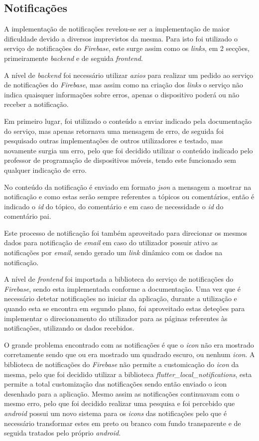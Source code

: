 \subsection{Notificações}

A implementação de notificações revelou-se ser a implementação de maior dificuldade devido a diversos imprevistos da mesma. Para isto foi utilizado o serviço de notificações do \textit{Firebase}, este surge assim como os \textit{links}, em 2 secções, primeiramente \textit{backend} e de seguida \textit{frontend}.

A nível de \textit{backend} foi necessário utilizar \textit{axios} para realizar um pedido ao serviço de notificações do \textit{Firebase}, mas assim como na criação dos \textit{links} o serviço não indica quaisquer informações sobre erros, apenas o dispositivo poderá ou não receber a notificação. 

Em primeiro lugar, foi utilizado o conteúdo a enviar indicado pela documentação do serviço, mas apenas retornava uma mensagem de erro, de seguida foi pesquisado outras implementações de outros utilizadores e testado, mas novamente surgia um erro, pelo que foi decidido utilizar o conteúdo indicado pelo professor de programação de dispositivos móveis, tendo este funcionado sem qualquer indicação de erro. 

No conteúdo da notificação é enviado em formato \textit{json} a mensagem a mostrar na notificação e como estas serão sempre referentes a tópicos ou comentários, então é indicado o \textit{id} do tópico, do comentário e em caso de necessidade o \textit{id} do comentário pai.

Este processo de notificação foi também aproveitado para direcionar os mesmos dados para notificação de \textit{email} em caso do utilizador possuir ativo as notificações por \textit{email}, sendo gerado um \textit{link} dinâmico com os dados na notificação.

A nível de \textit{frontend} foi importada a biblioteca do serviço de notificações do \textit{Firebase}, sendo esta implementada conforme a documentação. Uma vez que é necessário detetar notificações no iniciar da aplicação, durante a utilização e quando esta se encontra em segundo plano, foi aproveitado estas deteções para implementar o direcionamento do utilizador para as páginas referentes às notificações, utilizando os dados recebidos.

O grande problema encontrado com as notificações é que o \textit{icon} não era mostrado corretamente sendo que ou era mostrado um quadrado escuro, ou nenhum \textit{icon}. A biblioteca de notificações do \textit{Firebase} não permite a customicação do \textit{icon} da mesma, pelo que foi decidido utilizar a biblioteca \textit{flutter\_local\_notifications}, esta permite a total customização das notificações sendo então enviado o icon desenhado para a aplicação. Mesmo assim as notificações continuavam com o mesmo erro, pelo que foi decidido realizar uma pesquisa e foi percebido que \textit{android} possui um novo sistema para os \textit{icons} das notificações pelo que é necessário transformar estes em preto ou branco com fundo transparente e de seguida tratados pelo próprio \textit{android}.

